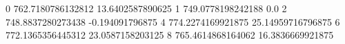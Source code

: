 0 762.7180786132812 13.6402587890625
1 749.0778198242188 0.0
2 748.8837280273438 -0.194091796875
4 774.2274169921875 25.14959716796875
6 772.1365356445312 23.0587158203125
8 765.4614868164062 16.3836669921875
